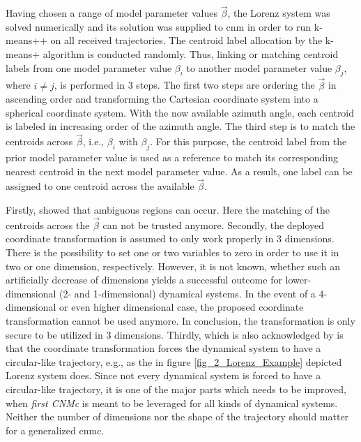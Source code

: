 Having chosen a range of model parameter values $\vec{\beta}$, the Lorenz system was solved numerically and its solution was supplied to \gls{cnm} in order to run k-means++ on all received trajectories.
The centroid label allocation by the k-means+ algorithm is conducted randomly. 
Thus, linking or matching centroid labels from one model parameter value $\beta_i$ to another model parameter value $\beta_j$, where $i \neq j$, is performed in 3 steps.
The first two steps are ordering the $\vec{\beta}$ in ascending
order and transforming the Cartesian coordinate system into a spherical coordinate system. 
With the now available azimuth angle, each centroid is labeled in increasing order of the azimuth angle. 
The third step is to match the centroids across $\vec{\beta}$, i.e., $\beta_i$ with $\beta_j$.
For this purpose, the centroid label from the prior model parameter value
is used as a reference to match its corresponding nearest centroid in the next model parameter value. 
As a result, one label can be assigned to one centroid across the available $\vec{\beta}$.\newline


Firstly, \cite{Max2021} showed that ambiguous regions can 
occur. Here the matching of the centroids across the $\vec{\beta}$ can 
not be trusted anymore.
Secondly, the deployed coordinate transformation is assumed to only work properly in 3 dimensions. There is the possibility to set one 
or two variables to zero in order to use it in two or one dimension, respectively. 
However, it is not known, whether such an artificially decrease of dimensions yields a successful outcome for lower-dimensional (2- and 1-dimensional) dynamical systems.  In the event of a 4-dimensional or even higher dimensional case, the proposed coordinate transformation cannot be used anymore. 
In conclusion, the transformation is only secure to be utilized in 3 dimensions. 
Thirdly, which is also acknowledged by \cite[]{Max2021} is that the 
coordinate transformation forces the dynamical system to have 
a circular-like trajectory, e.g., as the in figure \ref{fig_2_Lorenz_Example} depicted Lorenz system does. 
Since not every dynamical system is forced to have a circular-like trajectory, it is one of the major parts which needs to be improved, when \emph{first CNMc} is meant to be leveraged for all kinds of dynamical systems. 
Neither the number of dimensions nor the shape of the trajectory should matter for a generalized \gls{cnmc}.\newline 


